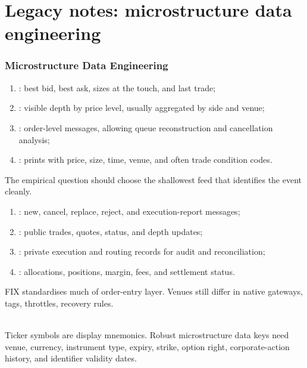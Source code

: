 \documentclass[a4paper,oneside,openany]{book}
\begin{document}
\chapter*{Legacy notes: microstructure data engineering}

\subsection*{Microstructure Data Engineering}

\begin{taxonomy} 
\begin{enumerate}[label=\roman*.]
\setlength{\itemsep}{0pt}
\item {}: best bid, best ask, sizes at the touch, and last trade;
\item {}: visible depth by price level, usually aggregated by side and venue;
\item {}: order-level messages, allowing queue reconstruction and cancellation analysis;
\item {}: prints with price, size, time, venue, and often trade condition codes.
\end{enumerate}
The empirical question should choose the shallowest feed that identifies the event cleanly.
\end{taxonomy}

\begin{taxonomy} 
\begin{enumerate}[label=\roman*.]
\setlength{\itemsep}{0pt}
\item {}: new, cancel, replace, reject, and execution-report messages;
\item {}: public trades, quotes, status, and depth updates;
\item {}: private execution and routing records for audit and reconciliation;
\item {}: allocations, positions, margin, fees, and settlement status.
\end{enumerate}
FIX standardises much of order-entry layer. Venues still differ in native gateways, tags, throttles, recovery rules.
\end{taxonomy}

\begin{caveat} \\
Ticker symbols are display mnemonics. Robust microstructure data keys need venue, currency, instrument type, expiry, strike, option right, corporate-action history, and identifier validity dates.
\end{caveat}
\end{document}
